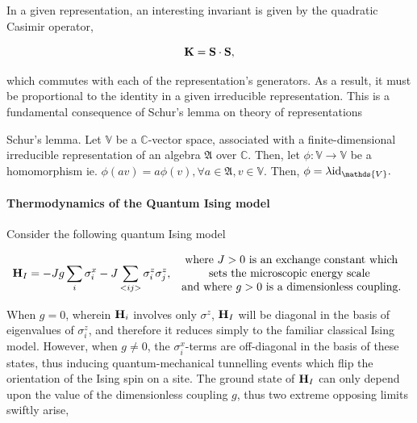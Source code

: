 \documentclass{homework}
\begin{document}
In a given representation, an interesting invariant is given by the quadratic Casimir operator, 

$$
{\bf K} = {\bf S} \cdot {\bf S},
$$

which commutes with each of the representation's generators. As a result, it must be proportional to the identity in a given irreducible representation. This is a fundamental consequence of Schur's lemma on theory of representations 

\begin{lemma} Schur's lemma. 
    Let $\mathds{V}$ be a $\mathds{C}$-vector space, associated with a finite-dimensional irreducible representation of an algebra $\mathfrak{A}$ over $\mathds{C}$. Then, let $\phi : \mathds{V} \rightarrow \mathds{V}$ be a homomorphism ie. $\phi(av) = a\phi(v), \forall a \in \mathfrak{A}, v \in \mathds{V}$. Then, $\phi = \lambda \textnormal{id}_{\mathds{V}}.$ \\
\end{lemma}

\paragraph{\textbf{Thermodynamics of the Quantum Ising model}}

Consider the following quantum Ising model 

$$
    {\bf H}_{I} = -Jg \sum_{i} \sigma_i^x - J \sum_{<ij>} \sigma_i^z \sigma_j^z, \begin{array}{c}
         \textnormal{ where $J>0$ is an exchange constant which}  \\
         \textnormal{ sets the microscopic energy scale } \\
         \textnormal{ and where $g>0$ is a dimensionless coupling.}
    \end{array}
$$

When $g=0$, wherein ${\bf H}_i$ involves only $\sigma^z$, ${\bf H}_I$ will be diagonal in the basis of eigenvalues of $\sigma^z_i$, and therefore it reduces simply to the familiar classical Ising model. However, when $g \neq 0$, the $\sigma_i^x$-terms are off-diagonal in the basis of these states, thus inducing quantum-mechanical tunnelling events which flip the orientation of the Ising spin on a site. The ground state of ${\bf H}_I$ can only depend upon the value of the dimensionless coupling $g$, thus two extreme opposing limits swiftly arise, 
\end{document}
